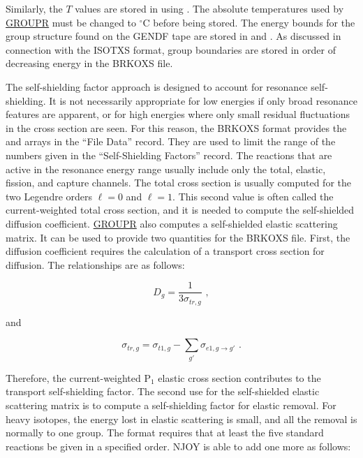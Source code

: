\noindent
Similarly, the $T$ values are stored in  using
.  The absolute temperatures used by
\hyperlink{sGROUPRhy}{GROUPR} must
be changed to $^\circ$C before being stored.
The energy bounds for the group structure found
on the GENDF tape are stored in  and .
As discussed in connection with the ISOTXS format, group boundaries
are stored in order of decreasing energy in the BRKOXS file.

The self-shielding factor approach is designed to account for
resonance self-shielding.  It is not necessarily
appropriate for low energies if only broad resonance features
are apparent, or for high energies where only small residual
fluctuations in the cross section are seen.  For
this reason, the BRKOXS format provides the 
and  arrays in the ``File Data'' record.  They
are used to limit the range of the numbers given
in the ``Self-Shielding Factors'' record.  The reactions that
are active in the resonance energy range usually include
only the total, elastic, fission, and capture channels.  The
total cross section is usually computed for the two Legendre
orders $\ell{=}0$ and $\ell{=}1$.  This second value is often
called the current-weighted total cross section, and it is
needed to compute the self-shielded diffusion
coefficient.  \hyperlink{sGROUPRhy}{GROUPR} also computes
a self-shielded elastic scattering matrix.
It can be used to provide two quantities for the BRKOXS file.
First, the diffusion coefficient requires the calculation of
a transport cross section for diffusion.  The relationships are
as follows:

\begin{equation}
   D_g=\frac{1}{3\sigma_{tr,g}}\,\,,
\end{equation}

\noindent
and

\begin{equation}
   \sigma_{tr,g}=\sigma_{t1,g}- \sum_{g'}
      \sigma_{e1,g\rightarrow g'}\,\,.
\end{equation}

\noindent
Therefore, the current-weighted P$_1$ elastic cross section
contributes to the transport self-shielding factor.  The
second use for the self-shielded elastic scattering matrix
is to compute a self-shielding factor for elastic removal.  For
heavy isotopes, the energy lost in elastic scattering is small,
and all the removal is normally to one group.  The format requires
that at least the five standard reactions be given in a specified
order.  NJOY is able to add one more as follows:

